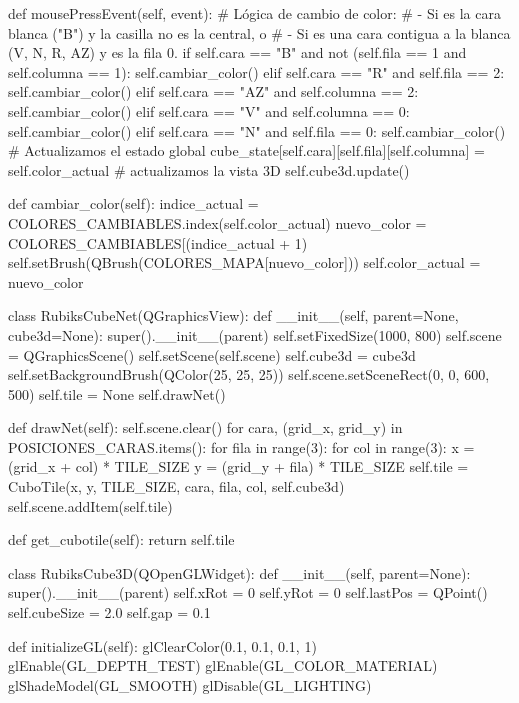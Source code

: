         
    def mousePressEvent(self, event):
        # Lógica de cambio de color:
        # - Si es la cara blanca ("B") y la casilla no es la central, o
        # - Si es una cara contigua a la blanca (V, N, R, AZ) y es la fila 0.
        if self.cara == "B" and not (self.fila == 1 and self.columna == 1):
            self.cambiar_color()
        elif self.cara == "R" and self.fila == 2:
            self.cambiar_color()
        elif self.cara == "AZ" and self.columna == 2:
            self.cambiar_color()
        elif self.cara == "V" and self.columna == 0:
            self.cambiar_color()
        elif self.cara == "N" and self.fila == 0:
            self.cambiar_color()
        # Actualizamos el estado global
        cube_state[self.cara][self.fila][self.columna] = self.color_actual  
        # actualizamos la vista 3D
        self.cube3d.update()

    def cambiar_color(self):
        indice_actual = COLORES_CAMBIABLES.index(self.color_actual)
        nuevo_color = COLORES_CAMBIABLES[(indice_actual + 1) %
        self.setBrush(QBrush(COLORES_MAPA[nuevo_color]))
        self.color_actual = nuevo_color

class RubiksCubeNet(QGraphicsView):
    def __init__(self, parent=None, cube3d=None):
        super().__init__(parent)
        self.setFixedSize(1000, 800)
        self.scene = QGraphicsScene()
        self.setScene(self.scene)
        self.cube3d = cube3d
        self.setBackgroundBrush(QColor(25, 25, 25))
        self.scene.setSceneRect(0, 0, 600, 500)
        self.tile = None
        self.drawNet()
        

    def drawNet(self):
        self.scene.clear()
        for cara, (grid_x, grid_y) in POSICIONES_CARAS.items():
            for fila in range(3):
                for col in range(3):
                    x = (grid_x + col) * TILE_SIZE
                    y = (grid_y + fila) * TILE_SIZE
                    self.tile = CuboTile(x, y, TILE_SIZE, cara, fila, col, self.cube3d)
                    self.scene.addItem(self.tile)

    
    def get_cubotile(self):
        return self.tile

class RubiksCube3D(QOpenGLWidget):
    def __init__(self, parent=None):
        super().__init__(parent)
        self.xRot = 0
        self.yRot = 0
        self.lastPos = QPoint()
        self.cubeSize = 2.0
        self.gap = 0.1


    def initializeGL(self):
        glClearColor(0.1, 0.1, 0.1, 1)
        glEnable(GL_DEPTH_TEST)
        glEnable(GL_COLOR_MATERIAL)
        glShadeModel(GL_SMOOTH)
        glDisable(GL_LIGHTING) 


